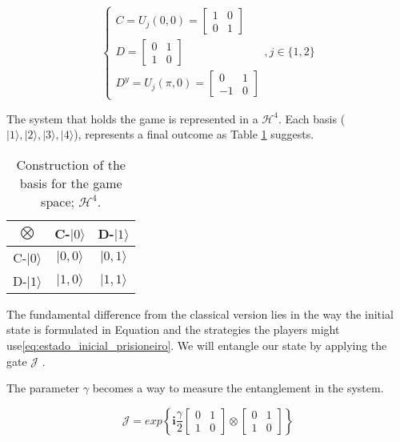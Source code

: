 \begin{equation}
\begin{cases}C= 
U_{j}(0, 0)=\left[\begin{array}{cc}
1 & 0\\
0 & 1
\end{array}\right]\\
D=\left[\begin{array}{cc}
0 & 1\\
1 & 0
\end{array}\right] \\
D^{y}= U_{j}(\pi, 0)=\left[\begin{array}{cc}
0 & 1\\
-1 & 0
\end{array}\right]
\end{cases} , j \in \{ 1, 2 \}
\label{eq:operators_prisioneiros_quanticosmiaurons}
\end{equation}

The system that holds the game is represented in a $\mathcal{H}^{4}$. Each basis ($\vert 1\rangle, \vert 2\rangle, \vert 3\rangle, \vert 4\rangle$), represents a final outcome as Table \ref{tab:prisioners_m} suggests.

\begin{table}
\begin{centering}
\begin{tabular}{ccc}
\hline 
$\bigotimes$ & C-$\vert 0\rangle$ & D-$\vert 1\rangle$\tabularnewline
\hline 
C-$\vert 0\rangle$ & $\vert 0,0\rangle$ & $\vert 0,1\rangle$\tabularnewline
D-$\vert 1\rangle$ & $\vert 1,0\rangle$ & $\vert 1,1\rangle$\tabularnewline
\hline 
\end{tabular}
\par\end{centering}

\caption{Construction of the basis for the game space; $\mathcal{H}^{4}$.}
\label{tab:prisioners_m}
\end{table}



The fundamental difference from the classical version lies in the way the initial state is formulated in Equation and the strategies the players might use\eqref{eq:estado_inicial_prisioneiro}. We will entangle our state by applying the gate $\mathcal{J}$ \cite{Letters2002}\cite{Eisert2008}. 

The parameter $\gamma$ becomes a way to measure the entanglement in the system\cite{Eisert2008}.

\begin{equation}
\label{eq:matrix_exponencial_esoterica}
\mathcal{J}=exp\left\{\mathbf{i}\frac{\gamma}{2}\left[\begin{array}{cc}
0 & 1\\
1 & 0
\end{array}\right]\otimes\left[\begin{array}{cc}
0 & 1\\
1 & 0
\end{array}\right]\right\}
\end{equation} 

